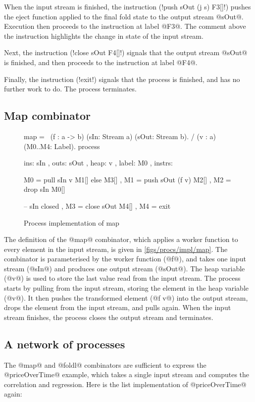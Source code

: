 When the input stream is finished, the instruction (\lstiproc!push sOut (j s) F3[]!) pushes the eject function applied to the final fold state to the output stream @sOut@.
Execution then proceeds to the instruction at label @F3@.
The comment above the instruction highlights the change in state of the input stream.

Next, the instruction (\lstiproc!close sOut F4[]!) signals that the output stream @sOut@ is finished, and then proceeds to the instruction at label @F4@.

Finally, the instruction (\lstiproc!exit!) signals that the process is finished, and has no further work to do.
The process terminates.

\subsection{Map combinator}

\begin{figure}
\begin{process}
map 
  = \ (f  : a -> b)
      (sIn: Stream a) (sOut: Stream b). 
    / (v  : a)        (M0..M4: Label).
    process
     { ins:    { sIn  }
     , outs:   { sOut }
     , heap:   { v }
     , label:  M0
     , instrs: { M0 = pull  sIn     v  M1[] else M3[]
               , M1 = push  sOut (f v) M2[]
               , M2 = drop  sIn        M0[]

               -- sIn closed
               , M3 = close sOut       M4[]
               , M4 = exit } }
\end{process}
\caption{Process implementation of map}
\label{figs/procs/impl/map}
\end{figure}

The definition of the @map@ combinator, which applies a worker function to every element in the input stream, is given in \autoref{figs/procs/impl/map}.
The combinator is parameterised by the worker function (@f@), and takes one input stream (@sIn@) and produces one output stream (@sOut@).
The heap variable (@v@) is used to store the last value read from the input stream.
The process starts by pulling from the input stream, storing the element in the heap variable (@v@).
It then pushes the transformed element (@f v@) into the output stream, drops the element from the input stream, and pulls again.
When the input stream finishes, the process closes the output stream and terminates.

\subsection{A network of processes}
The @map@ and @foldl@ combinators are sufficient to express the @priceOverTime@ example, which takes a single input stream and computes the correlation and regression.
Here is the list implementation of @priceOverTime@ again:

